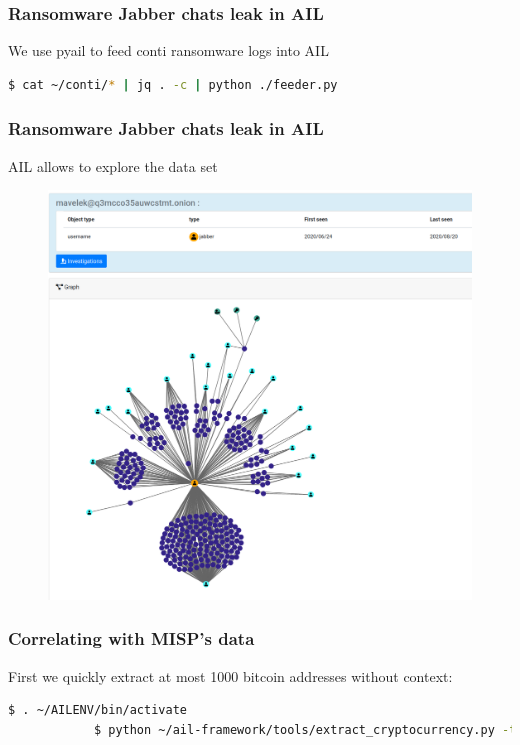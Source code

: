\begin{frame}[fragile]
    \frametitle{Ransomware Jabber chats leak in AIL}
        We use pyail to feed conti ransomware logs into AIL
        

        \begin{lstlisting}[language=bash]
        $ cat ~/conti/* | jq . -c | python ./feeder.py
        \end{lstlisting}
            
\end{frame}

\begin{frame}
    \frametitle{Ransomware Jabber chats leak in AIL}
    AIL allows to explore the data set
     \begin{figure}[t]
        \includegraphics[width=.75\textwidth]{pictures/contileaks-explore.png}
        \centering
    \end{figure}
           
\end{frame}

\begin{frame}[fragile]
    \frametitle{Correlating with MISP's data}
    First we quickly extract at most 1000 bitcoin addresses without context:

        \begin{lstlisting}[language=bash]
            $ . ~/AILENV/bin/activate
            $ python ~/ail-framework/tools/extract_cryptocurrency.py -t bitcoin -n 1000 | jq .[].nodes[].text | tr -d '"' 
        \end{lstlisting}
 
\end{frame}

